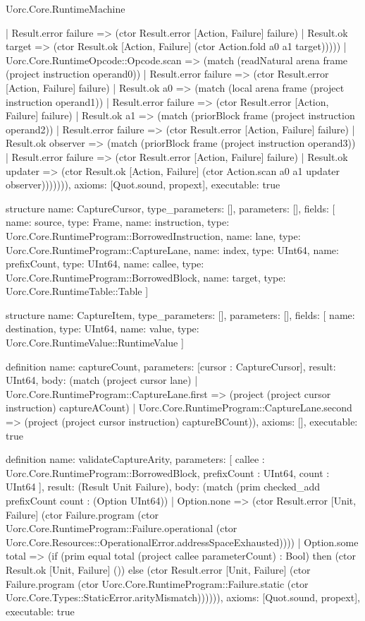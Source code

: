 \begin{lexlean}{Uorc.Core.RuntimeMachine}
\begin{semanticmodule}
{          | Result.error failure => (ctor Result.error [Action, Failure] failure)
          | Result.ok target => (ctor Result.ok [Action, Failure] (ctor Action.fold a0 a1 target)))))
    | Uorc.Core.RuntimeOpcode::Opcode.scan => (match (readNatural arena frame (project instruction operand0))
      | Result.error failure => (ctor Result.error [Action, Failure] failure)
      | Result.ok a0 => (match (local arena frame (project instruction operand1))
        | Result.error failure => (ctor Result.error [Action, Failure] failure)
        | Result.ok a1 => (match (priorBlock frame (project instruction operand2))
          | Result.error failure => (ctor Result.error [Action, Failure] failure)
          | Result.ok observer => (match (priorBlock frame (project instruction operand3))
            | Result.error failure => (ctor Result.error [Action, Failure] failure)
            | Result.ok updater => (ctor Result.ok [Action, Failure] (ctor Action.scan a0 a1 updater observer))))))),
  axioms: [Quot.sound, propext],
  executable: true
}

structure{
  name: CaptureCursor,
  type_parameters: [],
  parameters: [],
  fields: [
    {name: source, type: Frame},
    {name: instruction, type: Uorc.Core.RuntimeProgram::BorrowedInstruction},
    {name: lane, type: Uorc.Core.RuntimeProgram::CaptureLane},
    {name: index, type: UInt64},
    {name: prefixCount, type: UInt64},
    {name: callee, type: Uorc.Core.RuntimeProgram::BorrowedBlock},
    {name: target, type: Uorc.Core.RuntimeTable::Table}
  ]
}

structure{
  name: CaptureItem,
  type_parameters: [],
  parameters: [],
  fields: [
    {name: destination, type: UInt64},
    {name: value, type: Uorc.Core.RuntimeValue::RuntimeValue}
  ]
}

definition{
  name: captureCount,
  parameters: [cursor : CaptureCursor],
  result: UInt64,
  body: (match (project cursor lane)
    | Uorc.Core.RuntimeProgram::CaptureLane.first => (project (project cursor instruction) captureACount)
    | Uorc.Core.RuntimeProgram::CaptureLane.second => (project (project cursor instruction) captureBCount)),
  axioms: [],
  executable: true
}

definition{
  name: validateCaptureArity,
  parameters: [
    callee : Uorc.Core.RuntimeProgram::BorrowedBlock,
    prefixCount : UInt64,
    count : UInt64
  ],
  result: (Result Unit Failure),
  body: (match (prim checked_add prefixCount count : (Option UInt64))
    | Option.none => (ctor Result.error [Unit, Failure] (ctor Failure.program (ctor Uorc.Core.RuntimeProgram::Failure.operational (ctor Uorc.Core.Resources::OperationalError.addressSpaceExhausted))))
    | Option.some total => (if (prim equal total (project callee parameterCount) : Bool) then (ctor Result.ok [Unit, Failure] ()) else (ctor Result.error [Unit, Failure] (ctor Failure.program (ctor Uorc.Core.RuntimeProgram::Failure.static (ctor Uorc.Core.Types::StaticError.arityMismatch)))))),
  axioms: [Quot.sound, propext],
  executable: true
}


\end{semanticmodule}
\end{lexlean}
